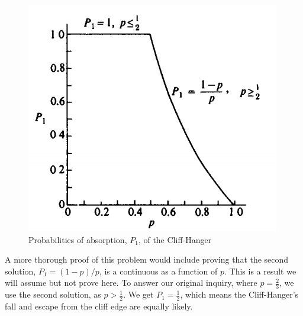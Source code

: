\documentclass[11pt]{article}
\begin{document}
\begin{figure}[H]
\centering
\includegraphics[scale = 0.8]{AbsorptionProbs}
\caption{Probabilities of absorption, $P_{1}$, of the Cliff-Hanger \protect\cite{50}}
\label{fig:AbsorptionProbs}
\end{figure}

A more thorough proof of this problem would include proving that the second solution, $P_{1} = (1 - p)/p$, is a continuous as a function of $p$. This is a result we will assume but not prove here. To answer our original inquiry, where $p = \frac{2}{3}$, we use the second solution, as $p > \frac{1}{2}$. We get $P_{1} = \frac{1}{2}$, which means the Cliff-Hanger's fall and escape from the cliff edge are equally likely.
\cite{50}
\end{document}
